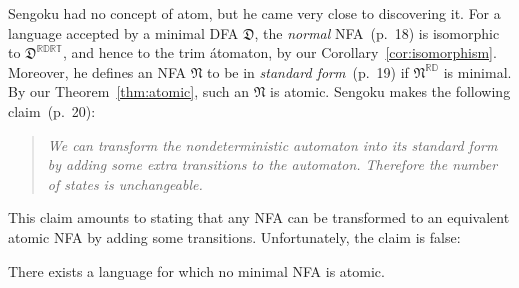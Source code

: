 \documentclass{llncs}
\newcommand{\fD}{{\mathfrak D}}
\newcommand{\fN}{{\mathfrak N}}
\newcommand{\rev}{\mathbb{R}}
\newcommand{\deter}{\mathbb{D}}
\newcommand{\trim}{\mathbb{T}}
\begin{document}
Sengoku had no concept of atom, but he came very close to discovering it.
For a language accepted by a minimal DFA $\fD$, the \emph{normal} 
NFA~\cite{Sen92}(p.~18) is isomorphic to $\fD^{\rev\deter\rev\trim}$, and hence to 
the trim \'atomaton, by our Corollary~\ref{cor:isomorphism}. 
Moreover, he defines an NFA $\fN$ to be in \emph{standard form}~\cite{Sen92}(p.~19) 
if $\fN^{\rev\deter}$ is minimal.
By our Theorem~\ref{thm:atomic}, such an $\fN$ is atomic.
Sengoku makes the following claim~\cite{Sen92}(p.~20):
\begin{quote}
\vskip-0.1cm
\emph{We can transform the nondeterministic automaton into its standard form 
by adding some extra transitions to the automaton. Therefore the number of 
states is unchangeable.}
\end{quote}
\vskip-0.1cm
This claim amounts to stating that any NFA can be transformed to an equivalent  
atomic NFA by adding some transitions. Unfortunately, the claim is false:
\begin{theorem}
\label{thm:Sengoku}
There exists a language for which no minimal NFA is atomic.
\end{theorem}
\end{document}
